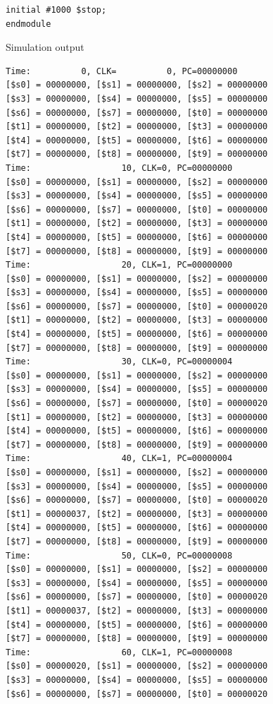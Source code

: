 \documentclass[a4paper,12pt]{article}
\begin{document}
\begin{lstlisting}
initial #1000 $stop;
endmodule
\end{lstlisting}

\Large Simulation output
\begin{lstlisting}
Time:          0, CLK=          0, PC=00000000
[$s0] = 00000000, [$s1] = 00000000, [$s2] = 00000000
[$s3] = 00000000, [$s4] = 00000000, [$s5] = 00000000
[$s6] = 00000000, [$s7] = 00000000, [$t0] = 00000000
[$t1] = 00000000, [$t2] = 00000000, [$t3] = 00000000
[$t4] = 00000000, [$t5] = 00000000, [$t6] = 00000000
[$t7] = 00000000, [$t8] = 00000000, [$t9] = 00000000
Time:                  10, CLK=0, PC=00000000
[$s0] = 00000000, [$s1] = 00000000, [$s2] = 00000000
[$s3] = 00000000, [$s4] = 00000000, [$s5] = 00000000
[$s6] = 00000000, [$s7] = 00000000, [$t0] = 00000000
[$t1] = 00000000, [$t2] = 00000000, [$t3] = 00000000
[$t4] = 00000000, [$t5] = 00000000, [$t6] = 00000000
[$t7] = 00000000, [$t8] = 00000000, [$t9] = 00000000
Time:                  20, CLK=1, PC=00000000
[$s0] = 00000000, [$s1] = 00000000, [$s2] = 00000000
[$s3] = 00000000, [$s4] = 00000000, [$s5] = 00000000
[$s6] = 00000000, [$s7] = 00000000, [$t0] = 00000020
[$t1] = 00000000, [$t2] = 00000000, [$t3] = 00000000
[$t4] = 00000000, [$t5] = 00000000, [$t6] = 00000000
[$t7] = 00000000, [$t8] = 00000000, [$t9] = 00000000
Time:                  30, CLK=0, PC=00000004
[$s0] = 00000000, [$s1] = 00000000, [$s2] = 00000000
[$s3] = 00000000, [$s4] = 00000000, [$s5] = 00000000
[$s6] = 00000000, [$s7] = 00000000, [$t0] = 00000020
[$t1] = 00000000, [$t2] = 00000000, [$t3] = 00000000
[$t4] = 00000000, [$t5] = 00000000, [$t6] = 00000000
[$t7] = 00000000, [$t8] = 00000000, [$t9] = 00000000
Time:                  40, CLK=1, PC=00000004
[$s0] = 00000000, [$s1] = 00000000, [$s2] = 00000000
[$s3] = 00000000, [$s4] = 00000000, [$s5] = 00000000
[$s6] = 00000000, [$s7] = 00000000, [$t0] = 00000020
[$t1] = 00000037, [$t2] = 00000000, [$t3] = 00000000
[$t4] = 00000000, [$t5] = 00000000, [$t6] = 00000000
[$t7] = 00000000, [$t8] = 00000000, [$t9] = 00000000
Time:                  50, CLK=0, PC=00000008
[$s0] = 00000000, [$s1] = 00000000, [$s2] = 00000000
[$s3] = 00000000, [$s4] = 00000000, [$s5] = 00000000
[$s6] = 00000000, [$s7] = 00000000, [$t0] = 00000020
[$t1] = 00000037, [$t2] = 00000000, [$t3] = 00000000
[$t4] = 00000000, [$t5] = 00000000, [$t6] = 00000000
[$t7] = 00000000, [$t8] = 00000000, [$t9] = 00000000
Time:                  60, CLK=1, PC=00000008
[$s0] = 00000020, [$s1] = 00000000, [$s2] = 00000000
[$s3] = 00000000, [$s4] = 00000000, [$s5] = 00000000
[$s6] = 00000000, [$s7] = 00000000, [$t0] = 00000020

\end{lstlisting}
\end{document}
